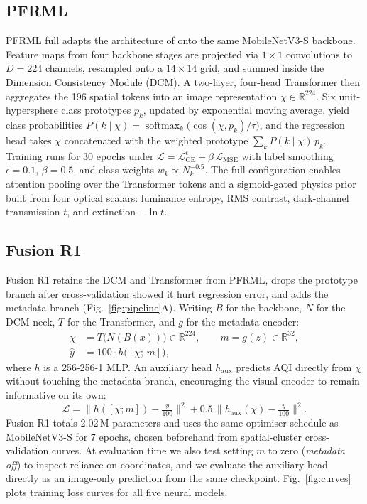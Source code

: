 \documentclass[conference]{IEEEtran}
\begin{document}
\subsection{PFRML}
PFRML full adapts the architecture of
\cite{wangPrototypeFeatureRepresentationGuided2026} onto the same MobileNetV3-S
backbone. Feature maps from four backbone stages are projected via $1\times1$
convolutions to $D{=}224$ channels, resampled onto a $14\times14$ grid, and
summed inside the Dimension Consistency Module (DCM). A two-layer, four-head
Transformer then aggregates the 196 spatial tokens into an image representation
$\chi\in\mathbb{R}^{224}$. Six unit-hypersphere class prototypes $p_k$, updated
by exponential moving average, yield class probabilities
$P(k\mid\chi) = \operatorname{softmax}_k\bigl(\cos(\chi,p_k)/\tau\bigr)$, and
the regression head takes $\chi$ concatenated with the weighted prototype
$\sum_k P(k\mid\chi)\,p_k$. Training runs for 30 epochs under
$\mathcal{L} = \mathcal{L}_{\mathrm{CE}}^{\epsilon} + \beta\,\mathcal{L}_{\mathrm{MSE}}$
with label smoothing $\epsilon{=}0.1$, $\beta{=}0.5$, and class weights
$w_k \propto N_k^{-0.5}$. The full configuration enables attention pooling over
the Transformer tokens and a sigmoid-gated physics prior built from four optical
scalars: luminance entropy, RMS contrast, dark-channel transmission $t$, and
extinction $-\ln t$.

\subsection{Fusion R1}
Fusion R1 retains the DCM and Transformer from PFRML, drops the prototype branch
after cross-validation showed it hurt regression error, and adds the metadata
branch (Fig.~\ref{fig:pipeline}A). Writing $B$ for the backbone, $N$ for the
DCM neck, $T$ for the Transformer, and $g$ for the metadata encoder:
\begin{align}
  \chi &= T\bigl(N(B(x))\bigr) \in \mathbb{R}^{224}, \qquad m = g(z) \in \mathbb{R}^{32},\\
  \hat{y} &= 100\cdot h\bigl([\chi;\, m]\bigr),
\end{align}
where $h$ is a 256-256-1 MLP. An auxiliary head $h_{\mathrm{aux}}$ predicts
AQI directly from $\chi$ without touching the metadata branch, encouraging the
visual encoder to remain informative on its own:
\begin{equation}
  \mathcal{L} = \bigl\|h([\chi;m]) - \tfrac{y}{100}\bigr\|^2 + 0.5\,\bigl\|h_{\mathrm{aux}}(\chi) - \tfrac{y}{100}\bigr\|^2 .
\end{equation}
Fusion R1 totals 2.02\,M parameters and uses the same optimiser schedule as
MobileNetV3-S for 7 epochs, chosen beforehand from spatial-cluster
cross-validation curves. At evaluation time we also test setting $m$ to zero
(\emph{metadata off}) to inspect reliance on coordinates, and we evaluate the
auxiliary head directly as an image-only prediction from the same checkpoint.
Fig.~\ref{fig:curves} plots training loss curves for all five neural models.
\end{document}
